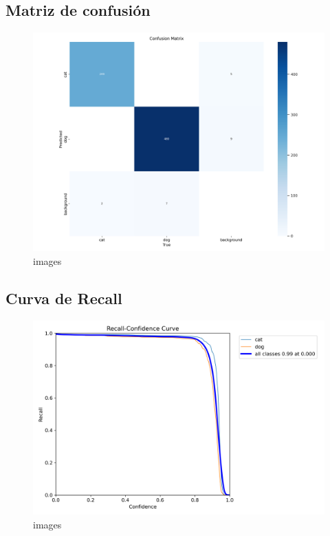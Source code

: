 \documentclass[11pt]{article}
\begin{document}
    \subsection{Matriz de confusión}\label{matriz-de-confusiuxf3n}

    \begin{figure}
\centering
\includegraphics{results/confusion_matrix.png}
\caption{images}
\end{figure}

\subsection{Curva de Recall}\label{curva-de-recall}

    \begin{figure}
\centering
\includegraphics{results/R_curve.png}
\caption{images}
\end{figure}
\end{document}
